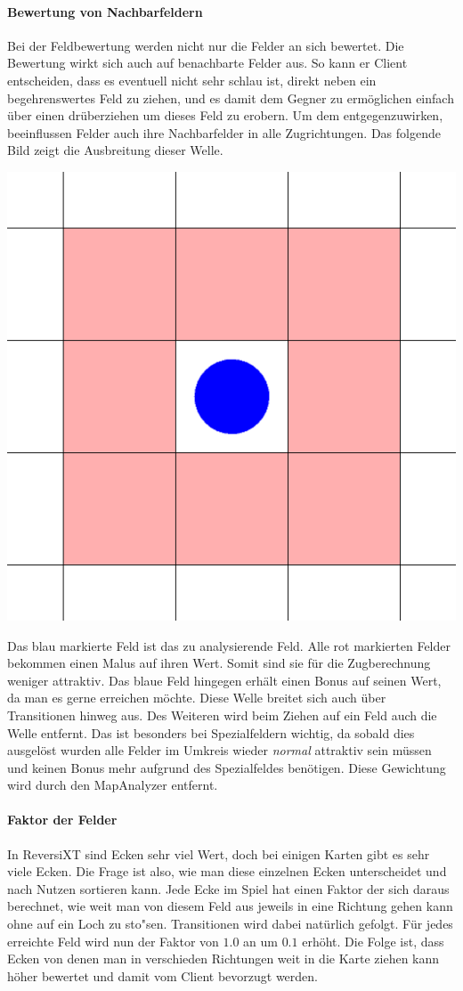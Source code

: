 \paragraph{Bewertung von Nachbarfeldern}
Bei der Feldbewertung werden nicht nur die Felder an sich bewertet.
Die Bewertung wirkt sich auch auf benachbarte Felder aus.
So kann er Client entscheiden, dass es eventuell nicht sehr schlau ist, direkt neben ein begehrenswertes Feld zu ziehen, und es damit dem Gegner zu erm\"oglichen einfach \"uber einen dr\"uberziehen um dieses Feld zu erobern.
Um dem entgegenzuwirken, beeinflussen Felder auch ihre Nachbarfelder in alle Zugrichtungen.
Das folgende Bild zeigt die Ausbreitung dieser Welle.

\vspace{1em}
\begin{minipage}{\linewidth}
    \centering
    \includegraphics[width=0.2\linewidth]{pics/middle}
    \label{fig:middle}
\end{minipage}
\vspace{1em}

Das blau markierte Feld ist das zu analysierende Feld.
Alle rot markierten Felder bekommen einen Malus auf ihren Wert.
Somit sind sie f\"ur die Zugberechnung weniger attraktiv.
Das blaue Feld hingegen erh\"alt einen Bonus auf seinen Wert, da man es gerne erreichen m\"ochte.
Diese Welle breitet sich auch \"uber Transitionen hinweg aus.
Des Weiteren wird beim Ziehen auf ein Feld auch die Welle entfernt.
Das ist besonders bei Spezialfeldern wichtig, da sobald dies ausgel\"ost wurden alle Felder im Umkreis wieder \textit{normal} attraktiv sein m\"ussen und keinen Bonus mehr aufgrund des Spezialfeldes ben\"otigen.
Diese Gewichtung wird durch den MapAnalyzer entfernt.

\paragraph{Faktor der Felder}
In ReversiXT sind Ecken sehr viel Wert, doch bei einigen Karten gibt es sehr viele Ecken.
Die Frage ist also, wie man diese einzelnen Ecken unterscheidet und nach Nutzen sortieren kann.
Jede Ecke im Spiel hat einen Faktor der sich daraus berechnet, wie weit man von diesem Feld aus jeweils in eine Richtung gehen kann ohne auf ein Loch zu sto"sen.
Transitionen wird dabei nat\"urlich gefolgt.
F\"ur jedes erreichte Feld wird nun der Faktor von $1.0$ an um $0.1$ erh\"oht.
Die Folge ist, dass Ecken von denen man in verschieden Richtungen weit in die Karte ziehen kann h\"oher bewertet und damit vom Client bevorzugt werden.

